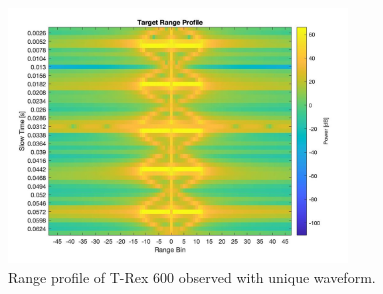 \begin{figure}[h!]
\centering
\includegraphics[width=9cm]{FMCW mD analysis-chap4/img/t-rex-600-rt-unique.jpg}
\caption{Range profile of T-Rex 600 observed with unique waveform.}
\label{t-rex600-unique-wave-rt}
\end{figure}

